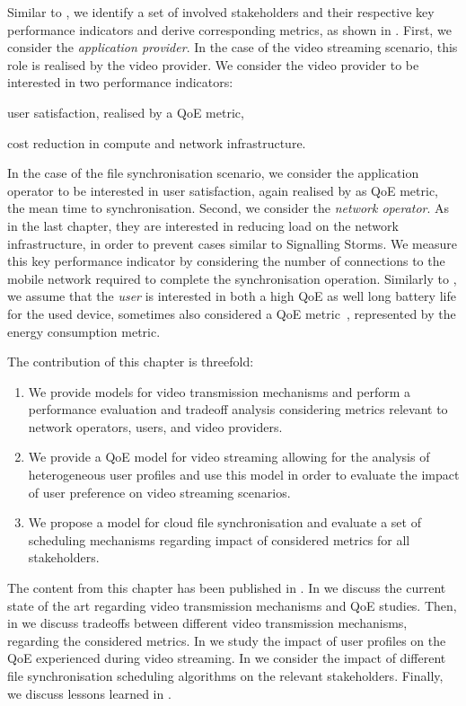 Similar to , we identify a set of involved stakeholders and their respective key performance indicators and derive corresponding metrics, as shown in .
First, we consider the \emph{application provider}. 
In the case of the video streaming scenario, this role is realised by the video provider.
We consider the video provider to be interested in two performance indicators: 
\begin{enumerate*}
\item user satisfaction, realised by a \gls{QoE} metric,
\item cost reduction in compute and network infrastructure.
\end{enumerate*}
In the case of the file synchronisation scenario, we consider the application operator to be interested in user satisfaction, again realised by as \gls{QoE} metric, the mean time to synchronisation.
Second, we consider the \emph{network operator}.
As in the last chapter, they are interested in reducing load on the network infrastructure, in order to prevent cases similar to Signalling Storms.
We measure this key performance indicator by considering the number of connections to the mobile network required to complete the synchronisation operation.
Similarly to , we assume that the \emph{user} is interested in both a high \gls{QoE} as well long battery life for the used device, sometimes also considered a \gls{QoE} metric~\cite{Ickin2012}, represented by the energy consumption metric. 

The contribution of this chapter is threefold:
\begin{enumerate}
\item We provide models for video transmission mechanisms and perform a performance evaluation and tradeoff analysis considering metrics relevant to network operators, users, and video providers.
\item We provide a \gls{QoE} model for video streaming allowing for the analysis of heterogeneous user profiles and use this model in order to evaluate the impact of user preference on video streaming scenarios.
\item We propose a model for cloud file synchronisation and evaluate a set of scheduling mechanisms regarding impact of considered metrics for all stakeholders.
\end{enumerate}

The content from this chapter has been published in \cite{Schwartz2013b, Hossfeld2015, Schwartz2014a}.
In  we discuss the current state of the art regarding video transmission mechanisms and \gls{QoE} studies.
Then, in  we discuss tradeoffs between different video transmission mechanisms, regarding the considered metrics.
In  we study the impact of user profiles on the \gls{QoE} experienced during video streaming.
In  we consider the impact of different file synchronisation scheduling algorithms on the relevant stakeholders.
Finally, we discuss lessons learned in .





